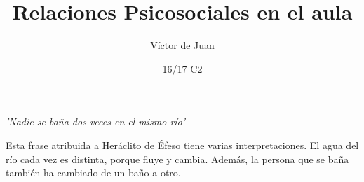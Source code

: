\documentclass[palatino]{apuntesURJC}
\title{Relaciones Psicosociales en el aula}
\author{Víctor de Juan}
\date{16/17 C2}
\begin{document}
\pagestyle{plain}
\maketitle

\tableofcontents
\newpage

\textit{’Nadie se baña dos veces en el mismo río’}

Esta frase atribuida a Heráclito de Éfeso tiene varias interpretaciones. 
%
El agua del río cada vez es distinta, porque fluye y cambia. 
%
Además, la persona que se baña también ha cambiado de un baño a otro.



\appendix



\printindex
\end{document}
